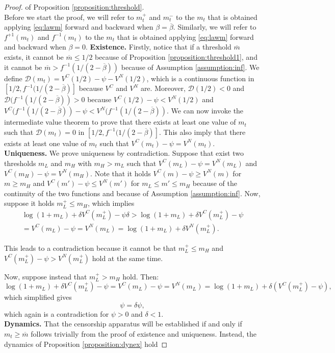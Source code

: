 \begin{proof} of Proposition \ref{proposition:threshold}.\\
Before we start the proof, we will refer to $m_t^+$ and $m_t^-$ to the $m_t$ that is obtained applying \ref{eq:lawm} forward and backward when $\beta=\overline{\beta}$. Similarly, we will refer to $f^{+1}(m_t)$ and $f^{-1}(m_t)$ to the $m_t$ that is obtained applying \ref{eq:lawm} forward and backward when $\beta=0$.
\textbf{Existence.} Firstly, notice that if a threshold $\overline{m}$ exists, it cannot be $\overline{m}\leq 1/2$ because of Proposition \ref{proposition:threshold1}, and it cannot be $\overline{m}>f^{-1}(1/(2-\overline{\beta}))$ because of Assumption \ref{assumption:inf}.
We define $\mathcal{D}(m_t)=V^C(1/2)-\psi-V^N(1/2)$, which is a continuous function in $[1/2,f^{-1}(1/(2-\overline{\beta})]$ because $V^C$ and $V^N$ are. Moreover, $\mathcal{D}(1/2)<0$ and $\mathcal{D}(f^{-1}(1/(2-\overline{\beta}))>0$  because $V^C(1/2)-\psi<V^N(1/2)$ and $V^C(f^{-1}(1/(2-\overline{\beta}))-\psi<V^N(f^{-1}(1/(2-\overline{\beta}))$. We can now invoke the intermediate value theorem to prove that there exists at least one value of $m_t$ such that $\mathcal{D}(m_t)=0$ in $[1/2,f^{-1}(1/(2-\overline{\beta})]$. This also imply that there exists at least one value of $m_t$ such that $V^C(m_t)-\psi=V^N(m_t)$.\\
\textbf{Uniqueness.} We prove uniqueness by contradiction. Suppose that exist two thresholds $m_L$ and $m_H$ with $m_H>m_L$ such that $V^C(m_L)-\psi=V^N(m_L)$ and $V^C(m_H)-\psi=V^N(m_H)$. Note that it holds $V^C(m)-\psi\geq V^N(m)$ for $m\geq m_H$ and $V^C(m')-\psi\leq V^N(m')$ for $m_L\leq m'\leq m_H$ because of the continuity of the two functions and because of Assumption \ref{assumption:inf}. Now, suppose it holds $m_L^+\leq m_H$, which implies
\begin{multline*}
\log(1+m_L)+\delta V^C(m_L^+)-\psi\delta>\log(1+m_L)+\delta V^C(m_L^+)-\psi\\=V^C(m_L)-\psi=V^N(m_L)=\log(1+m_L)+\delta V^N(m_L^+).
\end{multline*}

This leads to a contradiction because it cannot be that $m_L^+\leq m_H$ and $V^C(m_L^+)-\psi>V^N(m_L^+)$ hold at the same time.

Now, suppose instead that $m_L^+> m_H$ hold. Then:
\[
\log(1+m_L)+\delta V^C(m_L^+)-\psi=V^C(m_L)-\psi=V^N(m_L)=\log(1+m_L)+\delta (V^C(m_L^+)-\psi),
\]
which simplified gives
\[
\psi=\delta\psi,
\]
which again is a contradiction for $\psi>0$ and $\delta<1$.\\
\textbf{Dynamics.} That the censorship apparatus will be established if and only if $m_t\geq\overline{m}$ follows trivially from the proof of existence and uniqueness. Instead, the dynamics of Proposition \ref{proposition:dynex} hold
\end{proof}
